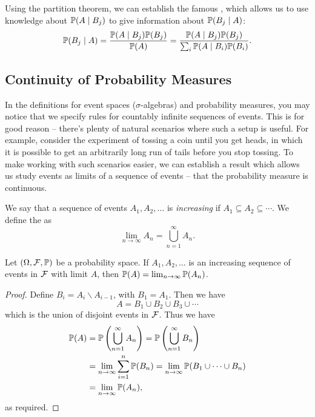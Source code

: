 \documentclass[a4paper]{scrartcl}
\begin{document}
Using the partition theorem, we can establish the famous , which allows us to use knowledge about $\mathbb{P}(A \mid B_j)$ to give information about $\mathbb{P}(B_j \mid A)$:
$$
\mathbb{P}(B_j \mid A) = \frac{\mathbb{P}(A \mid B_j) \mathbb{P}(B_j)}{\mathbb{P}(A)} = \frac{\mathbb{P}(A \mid B_j) \mathbb{P}(B_j)}{\sum_i \mathbb{P}(A \mid B_i) \mathbb{P}(B_i)}.
$$



\subsection{Continuity of Probability Measures}

In the definitions for event spaces ($\sigma$-algebras) and probability measures, you may notice that we specify rules for countably infinite sequences of events. This is for good reason -- there's plenty of natural scenarios where such a setup is useful. For example, consider the experiment of tossing a coin until you get heads, in which it is possible to get an arbitrarily long run of tails before you stop tossing. To make working with such scenarios easier, we can establish a result which allows us study events as limits of a sequence of events -- that the probability measure is continuous.


\begin{definition}
	We say that a sequence of events $A_1, A_2, \dots$ is \emph{increasing} if $A_1 \subseteq A_2 \subseteq \cdots$. We define the  as
	$$
	\lim_{n \to \infty} A_n = \bigcup_{n = 1}^{\infty} A_n.
	$$
\end{definition}

\begin{theorem}
	Let $(\Omega, \mathcal{F},\mathbb{P})$ be a probability space. If $A_1, A_2, \dots$ is an increasing sequence of events in $\mathcal{F}$ with limit $A$, then $\mathbb{P}(A) = \lim_{n \to \infty} \mathbb{P}(A_n)$.
\end{theorem}
\begin{proof}
	Define $B_i = A_i \backslash A_{i - 1}$, with $B_1 = A_1$. Then we have
	$$
A = B_1 \cup B_2 \cup B_3 \cup \cdots
	$$
	which is the union of disjoint events in $\mathcal{F}$. Thus we have
	\begin{align*}
		\mathbb{P}(A) &= \mathbb{P}\left(\bigcup_{n = 1}^{\infty} A_n\right) = \mathbb{P}\left(\bigcup_{n = 1}^{\infty} B_n\right) \\
		&= \lim_{n \to \infty} \sum_{i = 1}^{n} \mathbb{P}(B_n) = \lim_{n \to \infty} \mathbb{P}(B_1 \cup \cdots \cup B_n) \\ &= \lim_{n \to \infty} \mathbb{P}(A_n),
	\end{align*}
	as required.
\end{proof}
\end{document}
